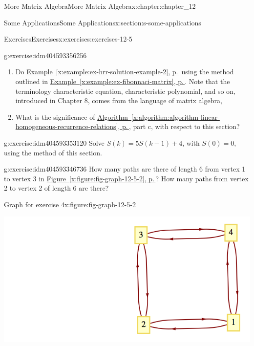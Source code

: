 \documentclass[twoside,10pt,]{book}
\newcommand{\xreffont}{\relax}
\numberwithin{equation}{section}
\begin{document}
\begin{chapterptx}{More Matrix Algebra}{}{More Matrix Algebra}{}{}{x:chapter:chapter_12}
\begin{sectionptx}{Some Applications}{}{Some Applications}{}{}{x:section:s-some-applications}
\begin{exercises-subsection}{Exercises}{}{Exercises}{}{}{x:exercises:exercises-12-5}
\begin{divisionexercise}{2}{}{}{g:exercise:idm404593356256}
\begin{enumerate}[label=(\alph*)]
\item{}Do \hyperref[x:example:ex-hrr-solution-example-2]{Example~{\xreffont\ref{x:example:ex-hrr-solution-example-2}}, p.\,\pageref{x:example:ex-hrr-solution-example-2}}  using the method outlined in \hyperref[x:example:ex-fibonnaci-matrix]{Example~{\xreffont\ref{x:example:ex-fibonnaci-matrix}}, p.\,\pageref{x:example:ex-fibonnaci-matrix}}. Note that the terminology characteristic equation, characteristic polynomial, and so on, introduced in Chapter 8, comes from the language of matrix algebra,%
\item{}What is the significance of \hyperref[x:algorithm:algorithm-linear-homogeneous-recurrence-relations]{Algorithm~{\xreffont\ref{x:algorithm:algorithm-linear-homogeneous-recurrence-relations}}, p.\,\pageref{x:algorithm:algorithm-linear-homogeneous-recurrence-relations}}, part c, with respect to this section?%
\end{enumerate}
%
\end{divisionexercise}%
\begin{divisionexercise}{3}{}{}{g:exercise:idm404593353120}%
Solve \(S(k) = 5S(k - 1) + 4\), with \(S(0) = 0\), using the method of this section.%
\end{divisionexercise}%
\begin{divisionexercise}{4}{}{}{g:exercise:idm404593346736}%
How many paths are there of length 6 from vertex 1 to vertex 3 in \hyperref[x:figure:fig-graph-12-5-2]{Figure~{\xreffont\ref{x:figure:fig-graph-12-5-2}}, p.\,\pageref{x:figure:fig-graph-12-5-2}}? How many paths from vertex 2 to vertex 2 of length 6 are there?%
\begin{figureptx}{Graph for exercise 4}{x:figure:fig-graph-12-5-2}{}%
\begin{image}{0.15}{0.7}{0.15}%
\includegraphics[width=\linewidth]{images/fig-graph-12-5-2.png}
\end{image}%
\tcblower

\end{figureptx}
\end{divisionexercise}
\end{exercises-subsection}
\end{sectionptx}
\end{chapterptx}
\end{document}
